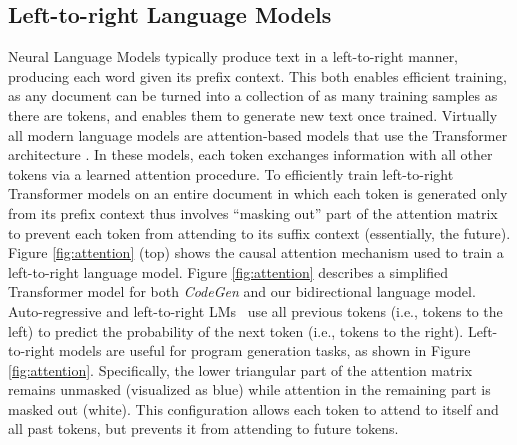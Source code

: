 \documentclass[12pt,openany,oneside,table]{cmuthesis}
\begin{document}
\subsection{Left-to-right Language Models}
Neural Language Models typically produce text in a left-to-right manner, producing each word given its prefix context. This both enables efficient training, as any document can be turned into a collection of as many training samples as there are tokens, and enables them to generate new text once trained.
Virtually all modern language models are attention-based models that use the Transformer architecture \cite{vaswani2017attention}. In these models, each token exchanges information with all other tokens via a learned attention procedure. To efficiently train left-to-right Transformer models on an entire document in which each token is generated only from its prefix context thus involves ``masking out'' part of the attention matrix to prevent each token from attending to its suffix context (essentially, the future). 
Figure \ref{fig:attention} (top) shows the causal attention mechanism used to train a left-to-right language model. 
Figure \ref{fig:attention} describes a simplified Transformer model for both \textit{CodeGen} and our bidirectional language model.
Auto-regressive and left-to-right LMs~\cite{chen2021evaluating, black2021gpt, tunstall2022natural, nijkamp2022codegen} use all previous tokens (i.e., tokens to the left) to predict the probability of the next token (i.e., tokens to the right).
Left-to-right models are useful for program generation tasks, as shown in Figure \ref{fig:attention}.
Specifically, the lower triangular part of the attention matrix remains unmasked (visualized as blue) while attention in the remaining part is masked out (white). This configuration allows each token to attend to itself and all past tokens, but prevents it from attending to future tokens.
\end{document}
